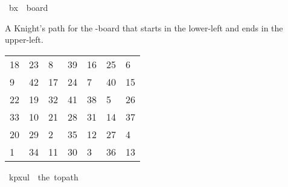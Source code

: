 \begin{isabellebody}
\isanewline
\isanewline
{}\isamarkupfalse%
\ {\isachardoublequoteopen}b{}x{}\ {\isasymequiv}\ board\ {}\ {}{\isachardoublequoteclose}%
\begin{isamarkuptext}%
A Knight's path for the -board that starts in the lower-left and ends in the 
upper-left.
  \begin{table}[H]
    \begin{tabular}{lllllll}
      18 & 23 &  8 & 39 & 16 & 25 &  6 \\
       9 & 42 & 17 & 24 &  7 & 40 & 15 \\
      22 & 19 & 32 & 41 & 38 &  5 & 26 \\
      33 & 10 & 21 & 28 & 31 & 14 & 37 \\
      20 & 29 &  2 & 35 & 12 & 27 &  4 \\
       1 & 34 & 11 & 30 &  3 & 36 & 13
    \end{tabular}
  \end{table}%
\end{isamarkuptext}\isamarkuptrue%
\isamarkupfalse%
\ {\isachardoublequoteopen}kp{}x{}ul\ {\isasymequiv}\ the\ {\isacharparenleft}{\kern0pt}to{\isacharunderscore}{\kern0pt}path\ \isanewline
\ \ {\isacharbrackleft}{\kern0pt}{\isacharbrackleft}{\kern0pt}{}{}{\isacharcomma}{\kern0pt}{}{}{\isacharcomma}{\kern0pt}{}{\isacharcomma}{\kern0pt}{}{}{\isacharcomma}{\kern0pt}{}{}{\isacharcomma}{\kern0pt}{}{}{\isacharcomma}{\kern0pt}{}{\isacharbrackright}{\kern0pt}{\isacharcomma}{\kern0pt}\isanewline
\ \ {\isacharbrackleft}{\kern0pt}{}{\isacharcomma}{\kern0pt}{}{}{\isacharcomma}{\kern0pt}{}{}{\isacharcomma}{\kern0pt}{}{}{\isacharcomma}{\kern0pt}{}{\isacharcomma}{\kern0pt}{}{}{\isacharcomma}{\kern0pt}{}{}{\isacharbrackright}{\kern0pt}{\isacharcomma}{\kern0pt}\isanewline
\ \ {\isacharbrackleft}{\kern0pt}{}{}{\isacharcomma}{\kern0pt}{}{}{\isacharcomma}{\kern0pt}{}{}{\isacharcomma}{\kern0pt}{}{}{\isacharcomma}{\kern0pt}{}{}{\isacharcomma}{\kern0pt}{}{\isacharcomma}{\kern0pt}{}{}{\isacharbrackright}{\kern0pt}{\isacharcomma}{\kern0pt}\isanewline

\end{isabellebody}
